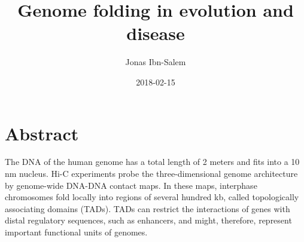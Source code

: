 \documentclass[a4paper,twoside=true,openright,parskip=full,chapterprefix=true,11pt,headings=normal,bibliography=totoc,listof=totoc,titlepage=on,captions=tableabove,draft=false]{scrreprt}
\title{Genome folding in evolution and disease}
\author{Jonas Ibn-Salem}
\date{2018-02-15}
\theoremstyle{definition}
\theoremstyle{definition}
\theoremstyle{definition}
\theoremstyle{remark}
\begin{document}




\pagestyle{empty}				%
\cleardoublepage

\pagestyle{plain}				%
\cleardoublepage
%
%

\setcounter{page}{1}			%
\pagestyle{maincontentstyle} 	%

{
\setcounter{tocdepth}{1}
\tableofcontents
}
\hypertarget{abstract}{%
\chapter*{Abstract}\label{abstract}}

The DNA of the human genome has a total length of 2 meters and fits into
a 10 nm nucleus. Hi-C experiments probe the three-dimensional genome
architecture by genome-wide DNA-DNA contact maps. In these maps,
interphase chromosomes fold locally into regions of several hundred kb,
called topologically associating domains (TADs). TADs can restrict the
interactions of genes with distal regulatory sequences, such as
enhancers, and might, therefore, represent important functional units of
genomes.
\end{document}
